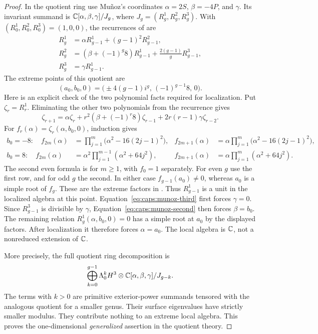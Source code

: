 \begin{proof}
In the quotient ring use Mu\~noz's coordinates
$\alpha=2S$, $\beta=-4P$, and $\gamma$.  Its invariant summand is
$\mathbb C[\alpha,\beta,\gamma]/J_g$, where
$J_g=(R_g^1,R_g^2,R_g^3)$.  With
$(R_0^1,R_0^2,R_0^3)=(1,0,0)$, the recurrences of
\cite[Theorem~16]{Munoz1999Ring} are
\begin{align}
 R_g^1&=\alpha R_{g-1}^1+(g-1)^2R_{g-1}^2,
                    \label{eq:caps:munoz-first}\\
 R_g^2&=(\beta+(-1)^g8)R_{g-1}^1
                      +\frac{2(g-1)}gR_{g-1}^3,
                    \label{eq:caps:munoz-second}\\
 R_g^3&=\gamma R_{g-1}^1.\label{eq:caps:munoz-third}
\end{align}
The extreme points of this quotient are
\[
 (a_0,b_0,0)=
 \bigl(\pm4(g-1)i^g,\,(-1)^{g-1}8,\,0\bigr).
\]
Here is an explicit check of the two polynomial facts required for
localization.  Put $\zeta_r=R_r^1$.  Eliminating the other two
polynomials from the recurrence gives
\[
 \zeta_{r+1}=\alpha\zeta_r
 +r^2(\beta+(-1)^r8)\zeta_{r-1}
 +2r(r-1)\gamma\zeta_{r-2}.
\]
For $f_r(\alpha)=\zeta_r(\alpha,b_0,0)$, induction gives
\begin{align*}
 b_0=-8:\quad
 f_{2m}(\alpha)&=\prod_{j=1}^{m}
                   \bigl(\alpha^2-16(2j-1)^2\bigr),&
 f_{2m+1}(\alpha)&=\alpha\prod_{j=1}^{m}
                   \bigl(\alpha^2-16(2j-1)^2\bigr),\\
 b_0=8:\quad
 f_{2m}(\alpha)&=\alpha^2\prod_{j=1}^{m-1}
                   (\alpha^2+64j^2),&
 f_{2m+1}(\alpha)&=\alpha\prod_{j=1}^{m}
                   (\alpha^2+64j^2).
\end{align*}
The second even formula is for $m\ge1$, with $f_0=1$ separately.
For even $g$ use the first row, and for odd $g$ the second.
In either case $f_{g-1}(a_0)\ne0$, whereas $a_0$ is a simple root
of $f_g$.  These are the extreme factors in
\cite[Proposition~20]{Munoz1999Ring}.
Thus $R_{g-1}^1$ is a unit in the localized algebra at this point.
Equation~\eqref{eq:caps:munoz-third} first forces $\gamma=0$.
Since $R_{g-1}^3$ is divisible by $\gamma$,
Equation~\eqref{eq:caps:munoz-second} then forces $\beta=b_0$.
The remaining relation $R_g^1(\alpha,b_0,0)=0$ has a simple root at
$a_0$ by the displayed factors.
After localization it therefore forces $\alpha=a_0$.  The local algebra
is $\mathbb C$, not a nonreduced extension of $\mathbb C$.

More precisely, the full quotient ring decomposition is
\[
 \bigoplus_{k=0}^{g-1}\Lambda_0^kH^3\otimes
       \mathbb C[\alpha,\beta,\gamma]/J_{g-k}.
\]
The terms with $k>0$ are primitive exterior-power summands tensored
with the analogous quotient for a smaller genus.
Their surface eigenvalues have strictly smaller modulus.  They contribute
nothing to an extreme local algebra.  This proves the one-dimensional
\emph{generalized} assertion in the quotient theory.


\end{proof}
